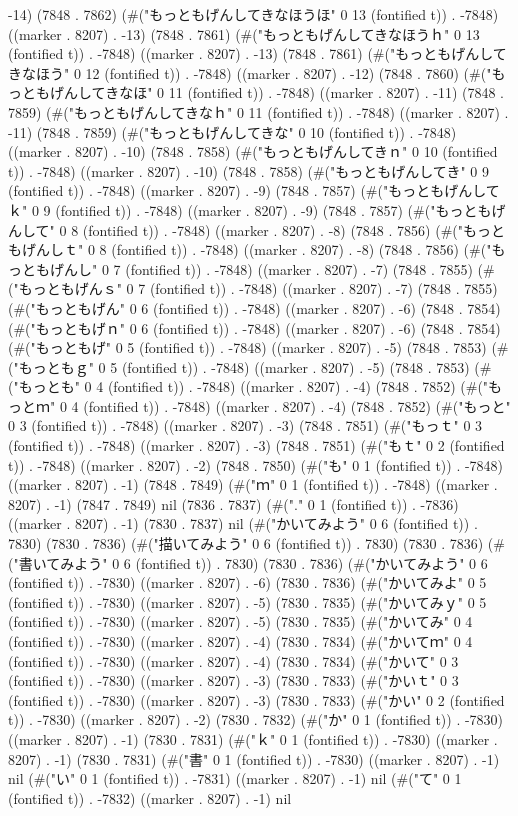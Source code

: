 -14) (7848 . 7862) (#("もっともげんしてきなほうほ" 0 13 (fontified t)) . -7848) ((marker . 8207) . -13) (7848 . 7861) (#("もっともげんしてきなほうｈ" 0 13 (fontified t)) . -7848) ((marker . 8207) . -13) (7848 . 7861) (#("もっともげんしてきなほう" 0 12 (fontified t)) . -7848) ((marker . 8207) . -12) (7848 . 7860) (#("もっともげんしてきなほ" 0 11 (fontified t)) . -7848) ((marker . 8207) . -11) (7848 . 7859) (#("もっともげんしてきなｈ" 0 11 (fontified t)) . -7848) ((marker . 8207) . -11) (7848 . 7859) (#("もっともげんしてきな" 0 10 (fontified t)) . -7848) ((marker . 8207) . -10) (7848 . 7858) (#("もっともげんしてきｎ" 0 10 (fontified t)) . -7848) ((marker . 8207) . -10) (7848 . 7858) (#("もっともげんしてき" 0 9 (fontified t)) . -7848) ((marker . 8207) . -9) (7848 . 7857) (#("もっともげんしてｋ" 0 9 (fontified t)) . -7848) ((marker . 8207) . -9) (7848 . 7857) (#("もっともげんして" 0 8 (fontified t)) . -7848) ((marker . 8207) . -8) (7848 . 7856) (#("もっともげんしｔ" 0 8 (fontified t)) . -7848) ((marker . 8207) . -8) (7848 . 7856) (#("もっともげんし" 0 7 (fontified t)) . -7848) ((marker . 8207) . -7) (7848 . 7855) (#("もっともげんｓ" 0 7 (fontified t)) . -7848) ((marker . 8207) . -7) (7848 . 7855) (#("もっともげん" 0 6 (fontified t)) . -7848) ((marker . 8207) . -6) (7848 . 7854) (#("もっともげｎ" 0 6 (fontified t)) . -7848) ((marker . 8207) . -6) (7848 . 7854) (#("もっともげ" 0 5 (fontified t)) . -7848) ((marker . 8207) . -5) (7848 . 7853) (#("もっともｇ" 0 5 (fontified t)) . -7848) ((marker . 8207) . -5) (7848 . 7853) (#("もっとも" 0 4 (fontified t)) . -7848) ((marker . 8207) . -4) (7848 . 7852) (#("もっとｍ" 0 4 (fontified t)) . -7848) ((marker . 8207) . -4) (7848 . 7852) (#("もっと" 0 3 (fontified t)) . -7848) ((marker . 8207) . -3) (7848 . 7851) (#("もっｔ" 0 3 (fontified t)) . -7848) ((marker . 8207) . -3) (7848 . 7851) (#("もｔ" 0 2 (fontified t)) . -7848) ((marker . 8207) . -2) (7848 . 7850) (#("も" 0 1 (fontified t)) . -7848) ((marker . 8207) . -1) (7848 . 7849) (#("ｍ" 0 1 (fontified t)) . -7848) ((marker . 8207) . -1) (7847 . 7849) nil (7836 . 7837) (#("." 0 1 (fontified t)) . -7836) ((marker . 8207) . -1) (7830 . 7837) nil (#("かいてみよう" 0 6 (fontified t)) . 7830) (7830 . 7836) (#("描いてみよう" 0 6 (fontified t)) . 7830) (7830 . 7836) (#("書いてみよう" 0 6 (fontified t)) . 7830) (7830 . 7836) (#("かいてみよう" 0 6 (fontified t)) . -7830) ((marker . 8207) . -6) (7830 . 7836) (#("かいてみよ" 0 5 (fontified t)) . -7830) ((marker . 8207) . -5) (7830 . 7835) (#("かいてみｙ" 0 5 (fontified t)) . -7830) ((marker . 8207) . -5) (7830 . 7835) (#("かいてみ" 0 4 (fontified t)) . -7830) ((marker . 8207) . -4) (7830 . 7834) (#("かいてｍ" 0 4 (fontified t)) . -7830) ((marker . 8207) . -4) (7830 . 7834) (#("かいて" 0 3 (fontified t)) . -7830) ((marker . 8207) . -3) (7830 . 7833) (#("かいｔ" 0 3 (fontified t)) . -7830) ((marker . 8207) . -3) (7830 . 7833) (#("かい" 0 2 (fontified t)) . -7830) ((marker . 8207) . -2) (7830 . 7832) (#("か" 0 1 (fontified t)) . -7830) ((marker . 8207) . -1) (7830 . 7831) (#("ｋ" 0 1 (fontified t)) . -7830) ((marker . 8207) . -1) (7830 . 7831) (#("書" 0 1 (fontified t)) . -7830) ((marker . 8207) . -1) nil (#("い" 0 1 (fontified t)) . -7831) ((marker . 8207) . -1) nil (#("て" 0 1 (fontified t)) . -7832) ((marker . 8207) . -1) nil 